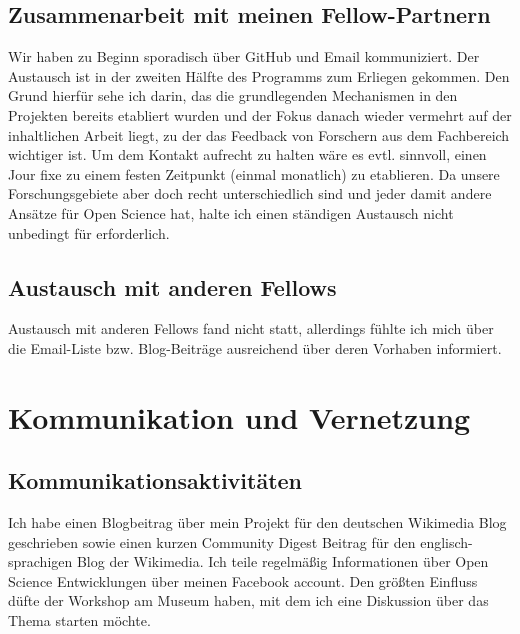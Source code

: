 \documentclass[11pt,a4paper]{article}
\begin{document}
\subsection{Zusammenarbeit mit meinen Fellow-Partnern}%
Wir haben zu Beginn sporadisch über GitHub und Email kommuniziert.
Der Austausch ist in der zweiten Hälfte des Programms zum Erliegen gekommen. Den Grund hierfür sehe ich darin, das die grundlegenden Mechanismen in den Projekten bereits etabliert wurden und der Fokus danach wieder vermehrt auf der inhaltlichen Arbeit liegt, zu der das Feedback von Forschern aus dem Fachbereich wichtiger ist. Um dem Kontakt aufrecht zu halten wäre es evtl. sinnvoll, einen Jour fixe zu einem festen Zeitpunkt (einmal monatlich) zu etablieren. Da unsere Forschungsgebiete aber doch recht unterschiedlich sind und jeder damit andere Ansätze für Open Science hat, halte ich einen ständigen Austausch nicht unbedingt für erforderlich.


\subsection{Austausch mit anderen Fellows}%
Austausch mit anderen Fellows fand nicht statt, allerdings fühlte ich mich über die Email-Liste bzw. Blog-Beiträge ausreichend über deren Vorhaben informiert.



\section{Kommunikation und Vernetzung}%
\subsection{Kommunikationsaktivitäten}%
Ich habe einen Blogbeitrag über mein Projekt für den deutschen Wikimedia Blog geschrieben sowie einen kurzen Community Digest Beitrag für den englisch-sprachigen Blog der Wikimedia. Ich  teile regelmäßig Informationen über Open Science Entwicklungen über meinen Facebook account. Den größten Einfluss düfte der Workshop am Museum haben, mit dem ich eine Diskussion über das Thema starten möchte. 
\end{document}
